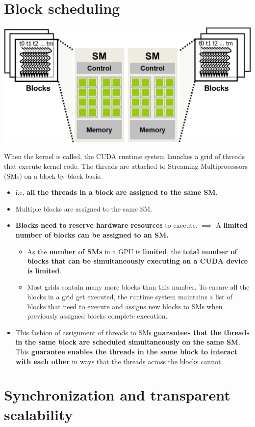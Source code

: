 \section{Block scheduling}
\begin{center}
    \includegraphics[width=0.7\linewidth]{Images/CompArch/block_assignment.png}
\end{center}
When the kernel is called, the CUDA runtime system launches a grid of threads that execute kernel code. The threads are attached to Streaming Multiprocessors (SMs) on a block-by-block basis.
\begin{itemize}
    \item i.e, \textbf{all the threads in a block are assigned to the same SM}.
    \item Multiple blocks are assigned to the same SM.
    \item \textbf{Blocks need to reserve hardware resources} to execute. $\implies$ A \textbf{limited number of blocks can be assigned to an SM.}
          \begin{itemize}
              \item As the \textbf{number of SMs} in a GPU is \textbf{limited}, the \textbf{total number of blocks that can be simultaneously executing on a CUDA device is limited}.
              \item Most grids contain many more blocks than this number. To ensure all the blocks in a grid get executed, the runtime system maintains a list of blocks that need to execute and assigns new blocks to SMs when previously assigned blocks complete execution.
          \end{itemize}
    \item This fashion of assignment of threads to SMs \textbf{guarantees that the threads in the same block are scheduled simultaneously on the same SM}. This \textbf{guarantee enables the threads in the same block to interact with each other} in ways that the threads across the blocks cannot.
\end{itemize}

\section{Synchronization and transparent scalability}